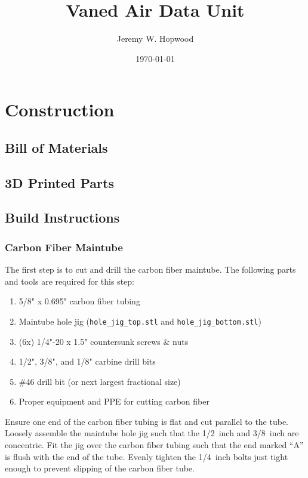 \documentclass[10pt,onecolumn]{article}
\title{Vaned Air Data Unit}
\author{Jeremy W. Hopwood}
\date{\today}
\begin{document}
	
\maketitle

\tableofcontents

\section{Construction}

	\subsection{Bill of Materials}
	
	\subsection{3D Printed Parts}
	
	\subsection{Build Instructions}
	
		\subsubsection{Carbon Fiber Maintube}
			
			The first step is to cut and drill the carbon fiber maintube. The following parts and tools are required for this step:
			\begin{enumerate}
				\item 5/8" x 0.695" carbon fiber tubing
				\item Maintube hole jig (\texttt{hole\_jig\_top.stl} and \texttt{hole\_jig\_bottom.stl})
				\item (6x) 1/4"-20 x 1.5" countersunk screws \& nuts
				\item 1/2", 3/8", and 1/8" carbine drill bits
				\item \#46 drill bit (or next largest fractional size)
				\item Proper equipment and PPE for cutting carbon fiber
			\end{enumerate}
			
			Ensure one end of the carbon fiber tubing is flat and cut parallel to the tube. Loosely assemble the maintube hole jig such that the 1/2~inch and 3/8~inch are concentric. Fit the jig over the carbon fiber tubing such that the end marked ``A'' is flush with the end of the tube. Evenly tighten the 1/4~inch bolts just tight enough to prevent slipping of the carbon fiber tube. 
			
\end{document}
